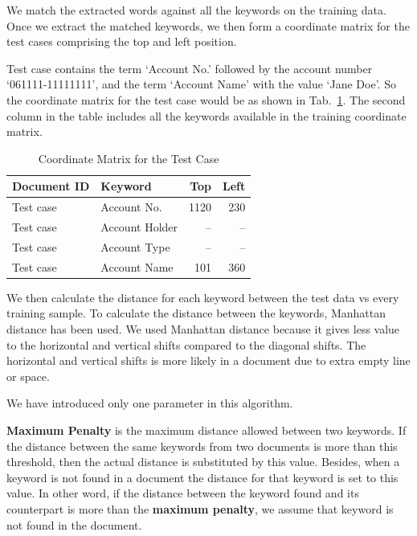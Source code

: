 We match the extracted words against all the keywords on the training data. Once we extract the matched keywords, we then form a coordinate matrix for the test cases comprising the top and left position. 
\begin{example}
Test case contains the term `Account No.’ followed by the account number `061111-11111111’, and the term `Account Name’ with the value `Jane Doe’. So the coordinate matrix for the test case would be as shown in Tab.~\ref{matrix2}. The second column in the table includes all the keywords available in the training coordinate matrix.
\end{example}
\begin{table}[tb]
\centering
\caption{Coordinate Matrix for the Test Case}\label{matrix2}
\begin{tabular}{llrr}
\toprule
Document ID & Keyword & Top & Left\\
\midrule
Test case & Account No. & 1120 & 230\\
Test case & Account Holder & -- & --\\
Test case & Account Type & -- & --\\
Test case & Account Name & 101 & 360\\
\bottomrule
\end{tabular}
\end{table}

We then calculate the distance for each keyword between the test data vs every training sample. To calculate the distance between the keywords, Manhattan distance has been used. We used Manhattan distance because it gives less value to the horizontal and vertical shifts compared to the diagonal shifts. The horizontal and vertical shifts is more likely in a document due to extra empty line or space.

We have introduced only one parameter in this algorithm.
\begin{definition}
\textbf{Maximum Penalty} is the maximum distance allowed between two keywords. If the distance between the same keywords from two documents is more than this threshold, then the actual distance is substituted by this value. Besides, when a keyword is not found in a document the distance for that keyword is set to this value. In other word, if the distance between the keyword found and its counterpart is more than the \textbf{maximum penalty}, we assume that keyword is not found in the document.
\end{definition}


